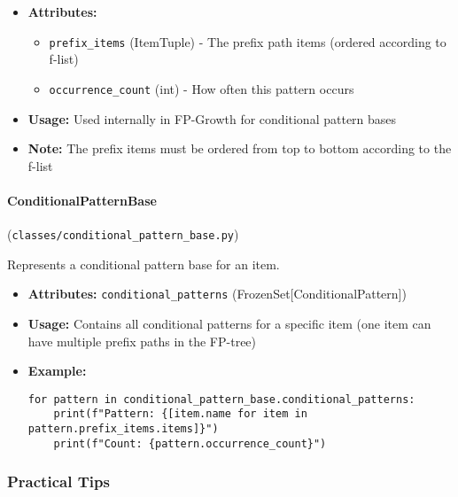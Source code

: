 \documentclass[
english,
smallborders
]{i6prcsht}
\begin{document}
\begin{itemize}
	\item \textbf{Attributes:}
	      \begin{itemize}
		      \item \texttt{prefix\_items} (ItemTuple) - The prefix path items (ordered according to f-list)
		      \item \texttt{occurrence\_count} (int) - How often this pattern occurs
	      \end{itemize}
	\item \textbf{Usage:} Used internally in FP-Growth for conditional pattern bases
	\item \textbf{Note:} The prefix items must be ordered from top to bottom according to the f-list
\end{itemize}

\vspace*{0.3cm}

\paragraph{ConditionalPatternBase} (\texttt{classes/conditional\_pattern\_base.py})

Represents a conditional pattern base for an item.

\begin{itemize}
	\item \textbf{Attributes:} \texttt{conditional\_patterns} (FrozenSet[ConditionalPattern])
	\item \textbf{Usage:} Contains all conditional patterns for a specific item (one item can have multiple prefix paths in the FP-tree)
	\item \textbf{Example:}
	      \begin{lstlisting}
for pattern in conditional_pattern_base.conditional_patterns:
    print(f"Pattern: {[item.name for item in pattern.prefix_items.items]}")
    print(f"Count: {pattern.occurrence_count}")
    \end{lstlisting}
\end{itemize}

\vspace*{0.3cm}

\vspace*{0.5cm}

\subsubsection*{Practical Tips}
\end{document}
